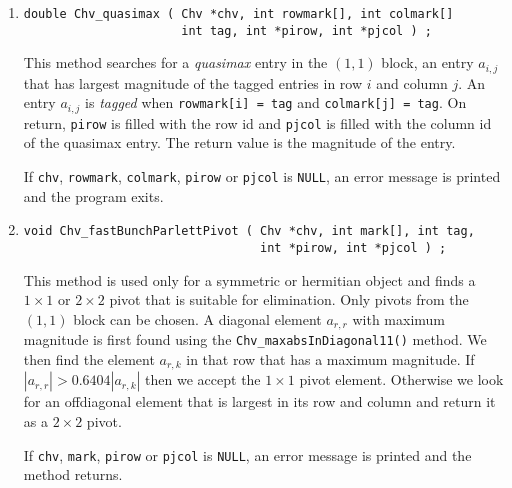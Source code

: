 \begin{enumerate}
real entries, i.e., if {\tt k = Chv\_maxabsColumn11(chv,...)},
then the complex entry is found in {\tt chv->entries[2*kk:2*kk+1]}.
\par {}
If {\tt chv} is {\tt NULL} or {\tt irow} is not in {\tt [0,n1-1]},
an error message is printed and the program exits.
\item
\begin{verbatim}
double Chv_quasimax ( Chv *chv, int rowmark[], int colmark[]
                      int tag, int *pirow, int *pjcol ) ;
\end{verbatim}
This method searches for a {\it quasimax} entry in the $(1,1)$
block, an entry $a_{i,j}$ that has largest magnitude 
of the tagged entries in row $i$ and column $j$.
An entry $a_{i,j}$ is {\it tagged} when {\tt rowmark[i] = tag}
and {\tt colmark[j] = tag}.
On return, 
{\tt *pirow} is filled with the row id and
{\tt *pjcol} is filled with the column id of the quasimax entry.
The return value is the magnitude of the entry.
\par {}
If {\tt chv}, {\tt rowmark}, {\tt colmark}, {\tt pirow} or {\tt pjcol}
is {\tt NULL},
an error message is printed and the program exits.
\item
\begin{verbatim}
void Chv_fastBunchParlettPivot ( Chv *chv, int mark[], int tag, 
                                 int *pirow, int *pjcol ) ;
\end{verbatim}
This method is used only for a symmetric or hermitian object and 
finds a $1 \times 1$ or $2 \times 2$ pivot 
that is suitable for elimination.
Only pivots from the $(1,1)$ block can be chosen.
A diagonal element $a_{r,r}$ with maximum magnitude is first found 
using the {\tt Chv\_maxabsInDiagonal11()} method.
We then find the element $a_{r,k}$ in that row that has 
a maximum magnitude.
If $|a_{r,r}| > 0.6404 |a_{r,k}|$ 
then we accept the $1 \times 1$ pivot element.
Otherwise we look for an offdiagonal element that is largest in its
row and column and return it as a $2 \times 2$ pivot.
\par {}
If {\tt chv}, {\tt mark}, {\tt pirow} or {\tt pjcol} is {\tt NULL}, 
an error message is printed and the method returns.
\end{enumerate}
\par
